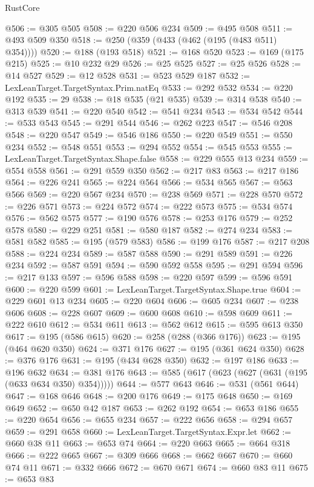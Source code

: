 \begin{lexlean}{RustCore}
\begin{coremodule}
@506 := @305 @505
@508 := @220 @506 @234
@509 := @495 @508
@511 := @493 @509 @350
@518 := @250 (@359 (@433 (@462 (@195 (@483 @511) @354))))
@520 := @188 (@193 @518)
@521 := @168 @520
@523 := @169 (@175 @215)
@525 := @10 @232 @29
@526 := @25 @525
@527 := @25 @526
@528 := @14 @527
@529 := @12 @528
@531 := @523 @529 @187
@532 := LexLeanTarget.TargetSyntax.Prim.natEq
@533 := @292 @532
@534 := @220 @192
@535 := 29
@538 := @18 @535 (@21 @535)
@539 := @314 @538
@540 := @313 @539
@541 := @220 @540
@542 := @541 @234
@543 := @534 @542
@544 := @533 @543
@545 := @291 @544
@546 := @262 @223
@547 := @546 @208
@548 := @220 @547
@549 := @546 @186
@550 := @220 @549
@551 := @550 @234
@552 := @548 @551
@553 := @294 @552
@554 := @545 @553
@555 := LexLeanTarget.TargetSyntax.Shape.false
@558 := @229 @555 @13 @234
@559 := @554 @558
@561 := @291 @559 @350
@562 := @217 @83
@563 := @217 @186
@564 := @226 @241
@565 := @224 @564
@566 := @534 @565
@567 := @563 @566
@569 := @220 @567 @234
@570 := @238 @569
@571 := @228 @570
@572 := @226 @571
@573 := @224 @572
@574 := @222 @573
@575 := @534 @574
@576 := @562 @575
@577 := @190 @576
@578 := @253 @176
@579 := @252 @578
@580 := @229 @251
@581 := @580 @187
@582 := @274 @234
@583 := @581 @582
@585 := @195 (@579 @583)
@586 := @199 @176
@587 := @217 @208
@588 := @224 @234
@589 := @587 @588
@590 := @291 @589
@591 := @226 @234
@592 := @587 @591
@594 := @590 @592 @558
@595 := @291 @594
@596 := @217 @133
@597 := @596 @588
@598 := @220 @597
@599 := @596 @591
@600 := @220 @599
@601 := LexLeanTarget.TargetSyntax.Shape.true
@604 := @229 @601 @13 @234
@605 := @220 @604
@606 := @605 @234
@607 := @238 @606
@608 := @228 @607
@609 := @600 @608
@610 := @598 @609
@611 := @222 @610
@612 := @534 @611
@613 := @562 @612
@615 := @595 @613 @350
@617 := @195 (@586 @615)
@620 := @258 (@288 (@366 @176))
@623 := @195 (@464 @620 @350)
@624 := @371 @176
@627 := @195 (@361 @624 @350)
@628 := @376 @176
@631 := @195 (@434 @628 @350)
@632 := @197 @186
@633 := @196 @632
@634 := @381 @176
@643 := @585 (@617 (@623 (@627 (@631 (@195 (@633 @634 @350) @354)))))
@644 := @577 @643
@646 := @531 (@561 @644)
@647 := @168 @646
@648 := @200 @176
@649 := @175 @648
@650 := @169 @649
@652 := @650 @42 @187
@653 := @262 @192
@654 := @653 @186
@655 := @220 @654
@656 := @655 @234
@657 := @222 @656
@658 := @294 @657
@659 := @291 @658
@660 := LexLeanTarget.TargetSyntax.Expr.let
@662 := @660 @38 @11
@663 := @653 @74
@664 := @220 @663
@665 := @664 @318
@666 := @222 @665
@667 := @309 @666
@668 := @662 @667
@670 := @660 @74 @11
@671 := @332 @666
@672 := @670 @671
@674 := @660 @83 @11
@675 := @653 @83

\end{coremodule}
\end{lexlean}
